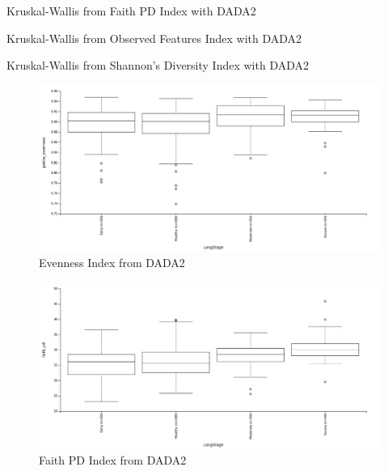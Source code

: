 \documentclass[a4paper]{article}
\begin{document}
            \begin{table}[p]
                \centering
                \caption{Kruskal-Wallis from Faith PD Index with DADA2}
                \label{tb:alpha-faith-dada2}
            \end{table}

            \begin{table}[p]
                \centering
                \caption{Kruskal-Wallis from Observed Features Index with DADA2}
                \label{tb:alpha-observed-dada2}
            \end{table}

            \begin{table}[p]
                \centering
                \caption{Kruskal-Wallis from Shannon's Diversity Index with DADA2}
                \label{tb:alpha-shannon-dada2}
            \end{table}

            \begin{figure}[p]
                \centering
                \includegraphics[width=0.8 \linewidth]{figures/AlphaDiversity/DADA2/evenness.png}
                \caption{Evenness Index from DADA2}
                \label{fig:evenness-dada2}
            \end{figure}

            \begin{figure}[p]
                \centering
                \includegraphics[width=0.8 \linewidth]{figures/AlphaDiversity/DADA2/faith.png}
                \caption{Faith PD Index from DADA2}
                \label{fig:faith-dada2}
            \end{figure}
\end{document}
